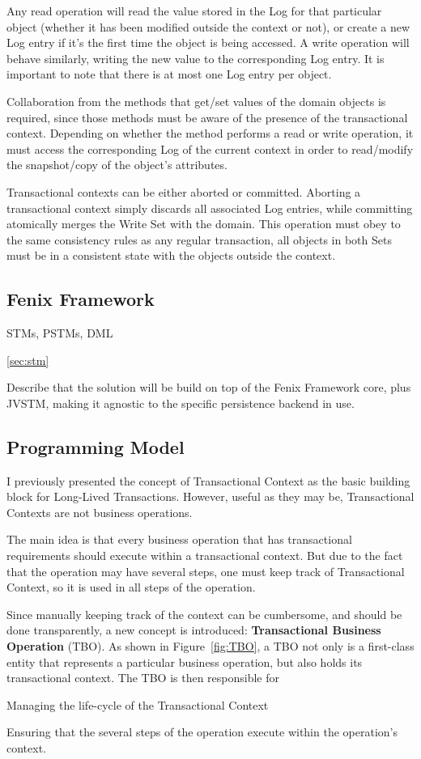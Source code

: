 \documentclass{llncs}
\begin{document}
Any read operation will read the value stored in the Log for that
particular object (whether it has been modified outside the context or
not), or create a new Log entry if it's the first time the object is
being accessed. A write operation will behave similarly, writing the
new value to the corresponding Log entry. It is important to note that
there is at most one Log entry per object.

Collaboration from the methods that get/set values of the domain
objects is required, since those methods must be aware of the presence
of the transactional context. Depending on whether the method performs
a read or write operation, it must access the corresponding Log of the
current context in order to read/modify the snapshot/copy of the
object's attributes.

Transactional contexts can be either aborted or committed. Aborting a
transactional context simply discards all associated Log entries,
while committing atomically merges the Write Set with the domain. This
operation must obey to the same consistency rules as any regular
transaction, all objects in both Sets must be in a consistent state
with the objects outside the context.

\subsection{Fenix Framework}

STMs, PSTMs, DML

\ref{sec:stm}

Describe that the solution will be build on top of the Fenix Framework
core, plus JVSTM, making it agnostic to the specific persistence
backend in use.

\subsection{Programming Model}

I previously presented the concept of Transactional Context as the
basic building block for Long-Lived Transactions. However, useful as
they may be, Transactional Contexts are not business operations.

The main idea is that every business operation that has transactional
requirements should execute within a transactional context. But due to
the fact that the operation may have several steps, one must keep
track of Transactional Context, so it is used in all steps of the
operation.

Since manually keeping track of the context can be cumbersome, and
should be done transparently, a new concept is introduced: {\bf
  Transactional Business Operation} (TBO). As shown in
Figure~\ref{fig:TBO}, a TBO not only is a first-class entity that
represents a particular business operation, but also holds its
transactional context. The TBO is then responsible for
\begin{inparaenum}[\itshape 1\upshape)]
\item Managing the life-cycle of the Transactional Context
\item Ensuring that the several steps of the operation execute within
  the operation's context.
\end{inparaenum}
\end{document}

